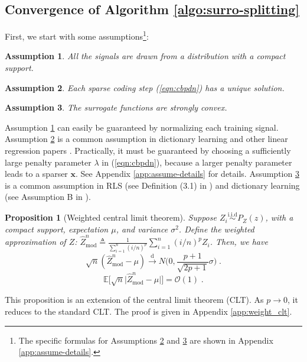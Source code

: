 \documentclass[final]{siamart1116}
\newcommand{\mb}[1]{\mathbf{#1}}
\def \co {\mathcal{O}}
\def \E  {\mathbb{E}}
\newtheorem{assume}{Assumption}
\newtheorem{prop}{Proposition}
\begin{document}
\subsection{Convergence of Algorithm \ref{algo:surro-splitting}}

First, we start with some assumptions\footnote{The specific formulas for Assumptions \ref{assume:uniqueness} and \ref{assume:surro} are shown in Appendix \ref{app:assume-details}.}:
\begin{assume}
\label{assume:bdd_signal}
All the signals are drawn from a distribution with a compact support.
\end{assume}
\begin{assume}
\label{assume:uniqueness}
Each sparse coding step (\ref{eqn:cbpdn}) has a unique solution.
\end{assume}
\begin{assume}
\label{assume:surro}
The surrogate functions are strongly convex.
\end{assume}

Assumption \ref{assume:bdd_signal} can easily be guaranteed by normalizing each training signal.  Assumption \ref{assume:uniqueness} is a common assumption in dictionary learning and other linear regression papers \cite{mairal2009online, efron2004least}. Practically, it must be guaranteed by choosing a sufficiently large penalty parameter $\lambda$ in (\ref{eqn:cbpdn}), because a larger penalty parameter leads to a sparser $\mb{x}$.  See Appendix \ref{app:assume-details} for details. Assumption \ref{assume:surro} is a common assumption in RLS (see Definition (3.1) in \cite{johnstone1982exponential}) and dictionary learning (see Assumption B in \cite{mairal-2010-online}).


\begin{prop}[Weighted central limit theorem]
\label{lemma:weight_clt}
Suppose $Z_i \overset{\text{i.i.d}}{\sim}P_Z(z)$, with a compact support, expectation $\mu$, and variance $\sigma^2$. Define the weighted approximation of $Z$: $\hat{Z}_{\mathrm{mod}}^n\triangleq\frac{1}{\sum_{i=1}^n(i/n)^p}\sum_{i=1}^n (i/n)^p Z_i$. Then, we have
\begin{equation}\label{eqn:weight_clt}
\sqrt{n} (\hat{Z}^n_{\mathrm{mod}} - \mu)  \overset{\text{d}}{\to} N\Big(0,\frac{p+1}{\sqrt{2p+1}}\sigma\Big) \;.
\end{equation}
\begin{equation}
\label{eqn:weight_clt_bdd}
\E\Big[\sqrt{n}\big|\hat{Z}^n_{\mathrm{mod}} - \mu\big|\Big] = \co(1) \;.
\end{equation}
\end{prop}
This proposition is an extension of the central limit theorem (CLT). As $p\to0$, it reduces to the standard CLT. The proof is given in Appendix \ref{app:weight_clt}.
\end{document}
